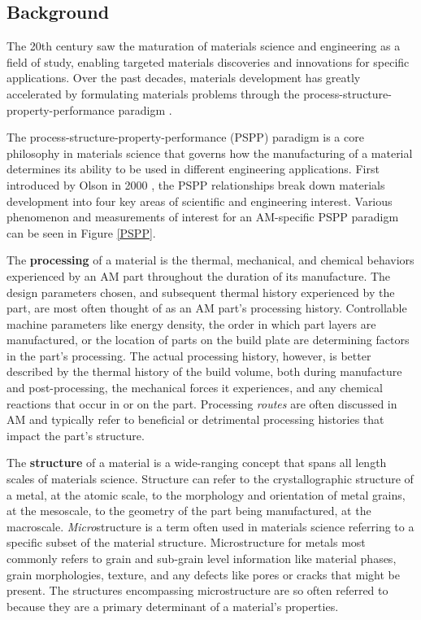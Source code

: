 \subsection{Background}
The 20th century saw the maturation of materials science and engineering as a field of study, enabling targeted materials discoveries and innovations for specific applications. Over the past decades, materials development has greatly accelerated by formulating materials problems through the process-structure-property-performance paradigm \cite{Olson2000, Panchal2013}. 

The process-structure-property-performance (PSPP) paradigm is a core philosophy in materials science that governs how the manufacturing of a material determines its ability to be used in different engineering applications. First introduced by Olson in 2000 \cite{Olson2000}, the PSPP relationships break down materials development into four key areas of scientific and engineering interest. Various phenomenon and measurements of interest for an AM-specific PSPP paradigm can be seen in Figure \ref{PSPP}.

The \textbf{processing} of a material is the thermal, mechanical, and chemical behaviors experienced by an AM part throughout the duration of its manufacture. The design parameters chosen, and subsequent thermal history experienced by the part, are most often thought of as an AM part's processing history. Controllable machine parameters like energy density, the order in which part layers are manufactured, or the location of parts on the build plate are determining factors in the part's processing. The actual processing history, however, is better described by the thermal history of the build volume, both during manufacture and post-processing, the mechanical forces it experiences, and any chemical reactions that occur in or on the part. Processing \textit{routes} are often discussed in AM and typically refer to beneficial or detrimental processing histories that impact the part's structure.

The \textbf{structure} of a material is a wide-ranging concept that spans all length scales of materials science. Structure can refer to the crystallographic structure of a metal, at the atomic scale, to the morphology and orientation of metal grains, at the mesoscale, to the geometry of the part being manufactured, at the macroscale. \textit{Micro}structure is a term often used in materials science referring to a specific subset of the material structure. Microstructure for metals most commonly refers to grain and sub-grain level information like material phases, grain morphologies, texture, and any defects like pores or cracks that might be present. The structures encompassing microstructure are so often referred to because they are a primary determinant of a material's properties. 

